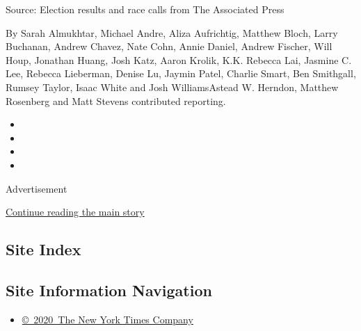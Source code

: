 Source: Election results and race calls from The Associated Press

By Sarah Almukhtar, Michael Andre, Aliza Aufrichtig, Matthew Bloch,
Larry Buchanan, Andrew Chavez, Nate Cohn, Annie Daniel, Andrew Fischer,
Will Houp, Jonathan Huang, Josh Katz, Aaron Krolik, K.K. Rebecca Lai,
Jasmine C. Lee, Rebecca Lieberman, Denise Lu, Jaymin Patel, Charlie
Smart, Ben Smithgall, Rumsey Taylor, Isaac White and Josh WilliamsAstead
W. Herndon, Matthew Rosenberg and Matt Stevens contributed reporting.

\begin{itemize}
\item
\item
\item
\item
\end{itemize}

Advertisement

\protect\hyperlink{after-bottom}{Continue reading the main story}

\hypertarget{site-index}{%
\subsection{Site Index}\label{site-index}}

\hypertarget{site-information-navigation}{%
\subsection{Site Information
Navigation}\label{site-information-navigation}}

\begin{itemize}
\tightlist
\item
  \href{https://help.nytimes3xbfgragh.onion/hc/en-us/articles/115014792127-Copyright-notice}{©~2020~The
  New York Times Company}
\end{itemize}

